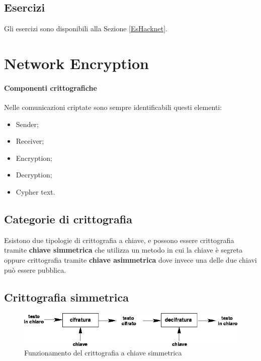 \subsection{Esercizi}

Gli esercizi sono disponibili alla Sezione \ref{EsHacknet}.


\section{Network Encryption}

\paragraph*{Componenti crittografiche}
Nelle comunicazioni criptate sono sempre identificabili questi elementi:
\begin{itemize}
\item Sender;
\item Receiver;
\item Encryption;
\item Decryption;
\item Cypher text.
\end{itemize}

\subsection{Categorie di crittografia}

Esistono due tipologie di crittografia a chiave, e possono essere crittografia
tramite \textbf{chiave simmetrica} che utilizza un metodo in cui la chiave è
segreta oppure crittografia tramite \textbf{chiave asimmetrica} dove invece una
delle due chiavi può essere pubblica.

\subsection{Crittografia simmetrica}

\begin{figure}[H]
\centering
\includegraphics[scale=0.55]{res/img/symmetric.png}
\caption{Funzionamento del crittografia a chiave simmetrica}
\label{fig:password:symmetric}
\end{figure}

